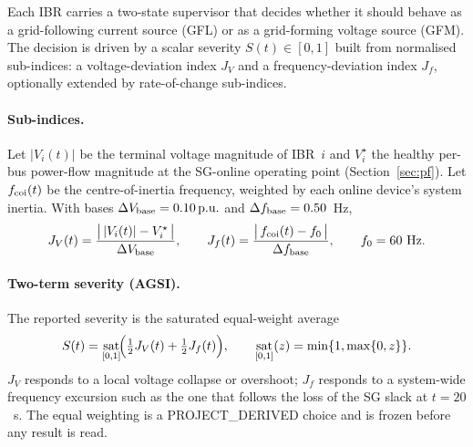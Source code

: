 \documentclass[12pt,a4paper]{article}
\DeclareMathOperator{\sat}{sat}
\newcommand{\pu}{\ifmmode\,\mathrm{p.u.}\else\ p.u.\fi}
\begin{document}
Each IBR carries a two-state supervisor that decides whether it should behave
as a grid-following current source (GFL) or as a grid-forming voltage source
(GFM).  The decision is driven by a scalar severity $S(t)\in[0,1]$ built from
normalised sub-indices: a voltage-deviation index $J_V$ and a
frequency-deviation index $J_f$, optionally extended by rate-of-change
sub-indices.

\paragraph{Sub-indices.}
Let $|V_i(t)|$ be the terminal voltage magnitude of IBR~$i$ and $V_i^{\star}$
the healthy per-bus power-flow magnitude at the SG-online operating point
(Section~\ref{sec:pf}).  Let $f_{\rm coi}(t)$ be the centre-of-inertia
frequency, weighted by each online device's system inertia.  With bases
$\Delta V_{\rm base}=0.10\pu$ and $\Delta f_{\rm base}=0.50$~Hz,
\begin{equation}
  J_V(t)=\frac{\bigl|\,|V_i(t)|-V_i^{\star}\,\bigr|}{\Delta V_{\rm base}},
  \qquad
  J_f(t)=\frac{\bigl|\,f_{\rm coi}(t)-f_0\,\bigr|}{\Delta f_{\rm base}},
  \qquad f_0=60~\mathrm{Hz}.
  \label{eq:jvjf}
\end{equation}

\paragraph{Two-term severity (AGSI).}
The reported severity is the saturated equal-weight average
\begin{equation}
  S(t)=\sat_{[0,1]}\!\Bigl(\tfrac12 J_V(t)+\tfrac12 J_f(t)\Bigr),
  \qquad
  \sat_{[0,1]}(z)=\min\{1,\max\{0,z\}\}.
  \label{eq:agsi}
\end{equation}
$J_V$ responds to a local voltage collapse or overshoot; $J_f$ responds to a
system-wide frequency excursion such as the one that follows the loss of the
SG slack at $t=20$~s.  The equal weighting is a \textsf{PROJECT\_DERIVED}
choice and is frozen before any result is read.
\end{document}
